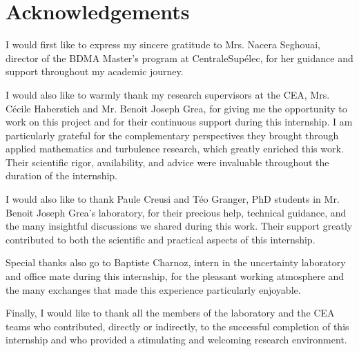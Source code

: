 \chapter*{Acknowledgements}

I would first like to express my sincere gratitude to Mrs. Nacera Seghouai, director of the BDMA Master's program at CentraleSupélec, for her guidance and support throughout my academic journey.

I would also like to warmly thank my research supervisors at the CEA, Mrs. Cécile Haberstich and Mr. Benoit Joseph Grea, for giving me the opportunity to work on this project and for their continuous support during this internship. I am particularly grateful for the complementary perspectives they brought through applied mathematics and turbulence research, which greatly enriched this work. Their scientific rigor, availability, and advice were invaluable throughout the duration of the internship.

I would also like to thank Paule Creusi and Téo Granger, PhD students in Mr. Benoit Joseph Grea's laboratory, for their precious help, technical guidance, and the many insightful discussions we shared during this work. Their support greatly contributed to both the scientific and practical aspects of this internship.

Special thanks also go to Baptiste Charnoz, intern in the uncertainty laboratory and office mate during this internship, for the pleasant working atmosphere and the many exchanges that made this experience particularly enjoyable.

Finally, I would like to thank all the members of the laboratory and the CEA teams who contributed, directly or indirectly, to the successful completion of this internship and who provided a stimulating and welcoming research environment.